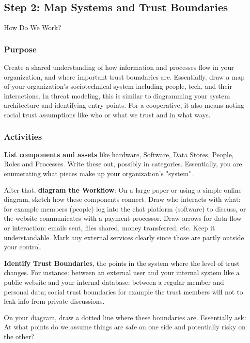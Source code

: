 \subsection{Step 2: Map Systems and Trust Boundaries}
\label{subsec:Step2}

How Do We Work?

\subsubsection{Purpose}

Create a shared understanding of how information and processes flow in your
organization, and where important trust boundaries are. Essentially, draw a map of your
organization's sociotechnical system including people, tech, and their
interactions. In threat modeling, this is similar to diagramming your system
architecture and identifying entry points. For a cooperative, it also means
noting social trust assumptions like who or what we trust and in what ways.

\subsubsection{Activities}

\textbf{List components and assets} like hardware, Software, Data Stores,
People, Roles and Processes. Write these out, possibly in categories.
Essentially, you are enumerating what pieces make up your organization's "system".

After that, \textbf{diagram the Workflow}: On a large paper or using a simple online diagram,
sketch how these components connect. Draw who interacts with what:
for example members (people) log into the chat platform (software) to discuss,
or the website communicates with a payment processor. Draw arrows for data flow
or interaction: emails sent, files shared, money transferred, etc. Keep it
understandable. Mark any external services clearly since those are partly
outside your control.

\textbf{Identify Trust Boundaries}, the points in the system where the
level of trust changes. For instance: between an external user and your
internal system like a public website and your internal database; between
a regular member and personal data; social trust boundaries for example
the trust members will not to leak info from private discussions.

On your diagram, draw a dotted line where these boundaries are.
Essentially ask: At what points do we assume things are safe on one side
and potentially risky on the other?

